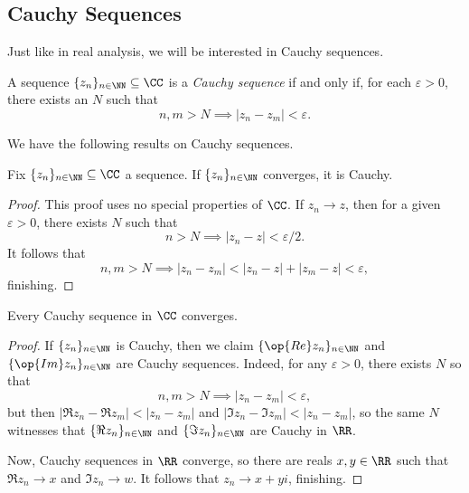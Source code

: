 \subsection{Cauchy Sequences}
Just like in real analysis, we will be interested in Cauchy sequences.
\begin{definition}
	A sequence $\{z_n\}_{n\in\NN}\subseteq\CC$ is a \textit{Cauchy sequence} if and only if, for each $\varepsilon>0$, there exists an $N$ such that
	\[n,m>N\implies|z_n-z_m|<\varepsilon.\]
\end{definition}
We have the following results on Cauchy sequences.
\begin{proposition}
	Fix $\{z_n\}_{n\in\NN}\subseteq\CC$ a sequence. If $\{z_n\}_{n\in\NN}$ converges, it is Cauchy.
\end{proposition}
\begin{proof}
	This proof uses no special properties of $\CC$. If $z_n\to z$, then for a given $\varepsilon>0$, there exists $N$ such that
	\[n>N\implies|z_n-z|<\varepsilon/2.\]
	It follows that
	\[n,m>N\implies|z_n-z_m|<|z_n-z|+|z_m-z|<\varepsilon,\]
	finishing.
\end{proof}
\begin{proposition}
	Every Cauchy sequence in $\CC$ converges.
\end{proposition}
\begin{proof}
	If $\{z_n\}_{n\in\NN}$ is Cauchy, then we claim $\{\op{Re}z_n\}_{n\in\NN}$ and $\{\op{Im}z_n\}_{n\in\NN}$ are Cauchy sequences. Indeed, for any $\varepsilon>0$, there exists $N$ so that
	\[n,m>N\implies|z_n-z_m|<\varepsilon,\]
	but then $|\Re z_n-\Re z_m|<|z_n-z_m|$ and $|\Im z_n-\Im z_m|<|z_n-z_m|$, so the same $N$ witnesses that $\{\Re z_n\}_{n\in\NN}$ and $\{\Im z_n\}_{n\in\NN}$ are Cauchy in $\RR$.

	Now, Cauchy sequences in $\RR$ converge, so there are reals $x,y\in\RR$ such that $\Re z_n\to x$ and $\Im z_n\to w$. It follows that $z_n\to x+yi$, finishing.
\end{proof}

